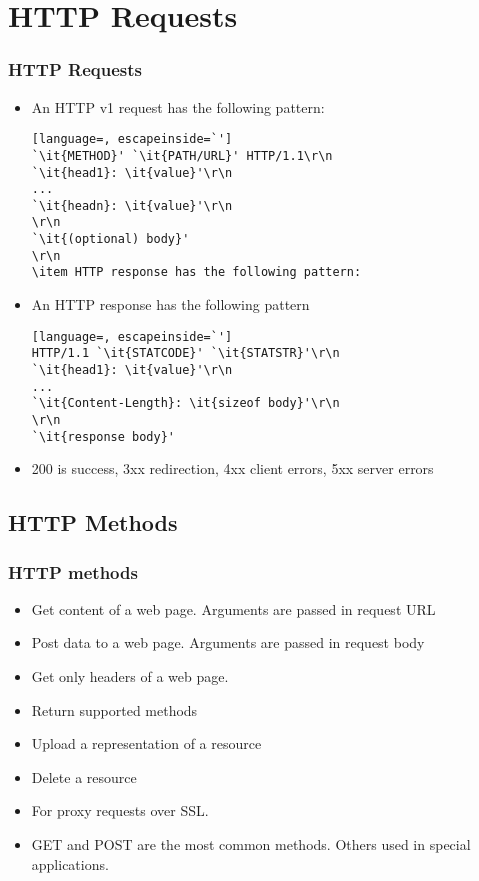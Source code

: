 \documentclass[trans,compress,xcolor=table]{beamer}
\begin{document}
\section{HTTP Requests}
\begin{frame}[fragile]
\frametitle{HTTP Requests}
\begin{itemize}
\item An HTTP v1 request has the following pattern:
\begin{lstlisting}[language=, escapeinside=`']
`\it{METHOD}' `\it{PATH/URL}' HTTP/1.1\r\n
`\it{head1}: \it{value}'\r\n
...
`\it{headn}: \it{value}'\r\n
\r\n
`\it{(optional) body}'
\r\n
\item HTTP response has the following pattern:
\end{lstlisting}
\item An HTTP response has the following pattern
\begin{lstlisting}[language=, escapeinside=`']
HTTP/1.1 `\it{STATCODE}' `\it{STATSTR}'\r\n
`\it{head1}: \it{value}'\r\n
...
`\it{Content-Length}: \it{sizeof body}'\r\n
\r\n
`\it{response body}'
\end{lstlisting}
\item 200 is success, 3xx redirection, 4xx client errors, 5xx server errors
\end{itemize}
\end{frame}

\subsection{HTTP Methods}
\begin{frame}[fragile]
\frametitle{HTTP methods}
\begin{itemize}
\item {} Get content of a web page. Arguments are passed in request URL
\item {} Post data to a web page. Arguments are passed in request body
\item {} Get only headers of a web page.
\item {} Return supported methods
\item {} Upload a representation of a resource
\item {} Delete a resource
\item {} For proxy requests over SSL.
\item GET and POST are the most common methods. Others used in special applications.
\end{itemize}
\end{frame}
\end{document}
